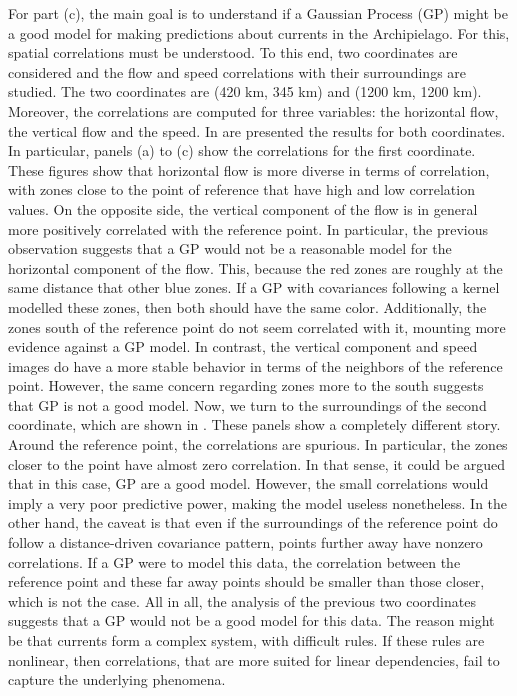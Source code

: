 \documentclass[11pt, english]{article}
\begin{document}
\begin{multicols}{2}
For part (c), the main goal is to understand if a Gaussian Process (GP) might be a good model for making predictions about currents in the Archipielago. For this, spatial correlations must be understood. To this end, two coordinates are considered and the flow and speed correlations with their surroundings are studied. The two coordinates are (420 km, 345 km) and (1200 km, 1200 km). Moreover, the correlations are computed for three variables: the horizontal flow, the vertical flow and the speed. In  are presented the results for both coordinates. In particular, panels (a) to (c) show the correlations for the first coordinate. These figures show that horizontal flow is more diverse in terms of correlation, with zones close to the point of reference that have high and low correlation values. On the opposite side, the vertical component of the flow is in general more positively correlated with the reference point. In particular, the previous observation suggests that a GP would not be a reasonable model for the horizontal component of the flow. This, because the red zones are roughly at the same distance that other blue zones. If a GP with covariances following a kernel modelled these zones, then both should have the same color. Additionally, the zones south of the reference point do not seem correlated with it, mounting more evidence against a GP model. In contrast, the vertical component and speed images do have a more stable behavior in terms of the neighbors of the reference point. However, the same concern regarding zones more to the south suggests that GP is not a good model. Now, we turn to the surroundings of the second coordinate, which are shown in . These panels show a completely different story. Around the reference point, the correlations are spurious. In particular, the zones closer to the point have almost zero correlation. In that sense, it could be argued that in this case, GP are a good model. However, the small correlations would imply a very poor predictive power, making the model useless nonetheless. In the other hand, the caveat is that even if the surroundings of the reference point do follow a distance-driven covariance pattern, points further away have nonzero correlations. If a GP were to model this data, the correlation between the reference point and these far away points should be smaller than those closer, which is not the case. All in all, the analysis of the previous two coordinates suggests that a GP would not be a good model for this data. The reason might be that currents form a complex system, with difficult rules. If these rules are nonlinear, then correlations, that are more suited for linear dependencies, fail to capture the underlying phenomena.




\end{multicols}
\end{document}
